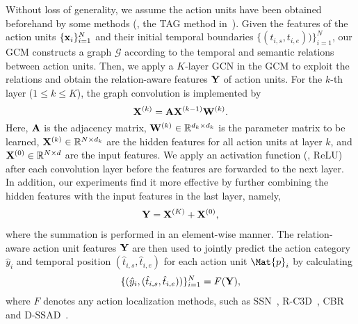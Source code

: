 \documentclass[10pt,journal,compsoc]{IEEEtran}
\begin{document}
	Without loss of generality, we assume the action units have been obtained beforehand by some methods (\eg, the TAG method in~\cite{zhao2017temporal}). Given the features of the action units $\{{\bf x}_i\}_{i=1}^N$ and their initial temporal boundaries $\{(t_{i,s}, t_{i,e}))\}_{i=1}^N$, our GCM constructs a graph $\mathcal{G}$ according to the temporal and semantic relations between action units. Then, we apply a $K$-layer GCN in the GCM to exploit the relations and obtain the relation-aware  features ${\bf Y}$ of action units.
	For the $k$-th layer ($1\leq k\leq K$), the graph convolution is implemented by
	\begin{equation} 
	\label{Eq:gcn}
	{\bf X}^{(k)} = {\bf A} {\bf X}^{(k-1)}{\bf W}^{(k)}.
	\end{equation}
	Here, ${\bf A}$ is the adjacency matrix, ${\bf W}^{(k)}\in\mathbb{R}^{d_k\times d_k}$ is the parameter matrix to be learned, ${\bf X}^{(k)}\in\mathbb{R}^{N \times d_k}$ are the hidden features for all action units at layer $k$, and ${\bf X}^{(0)}\in\mathbb{R}^{N \times d}$ are the input features. 
	We apply an activation function (\ie, ReLU) after each convolution layer before the features are forwarded to the next layer. In addition, our experiments find it more effective by further combining the hidden features with the input features in the last layer, namely, 
	\begin{eqnarray}
	\label{Eq:layer-wise}
	{\bf Y} = {\bf X}^{(K)} + {\bf X}^{(0)},
	\end{eqnarray}
	where the summation is performed in an element-wise manner. The relation-aware action unit features ${\bf Y}$ are then used to jointly predict the action category $\hat{y}_i$ and temporal position $(\hat{t}_{i,s}, \hat{t}_{i,e})$ for each action unit $\Mat{p}_i$ by calculating
	\begin{eqnarray}
	\label{Eq:gcn-p}
	\{(\hat{y}_i, (\hat{t}_{i,s}, \hat{t}_{i,e}))\}_{i=1}^{N} = F({\bf Y}), 
	\end{eqnarray}
	where $F$ denotes any action localization methods, such as SSN~\cite{zhao2017temporal}, R-C3D~\cite{xu2017r}, CBR~\cite{gao2017cascaded} and D-SSAD~\cite{huang2019decoupling}. 
	
	
\end{document}
